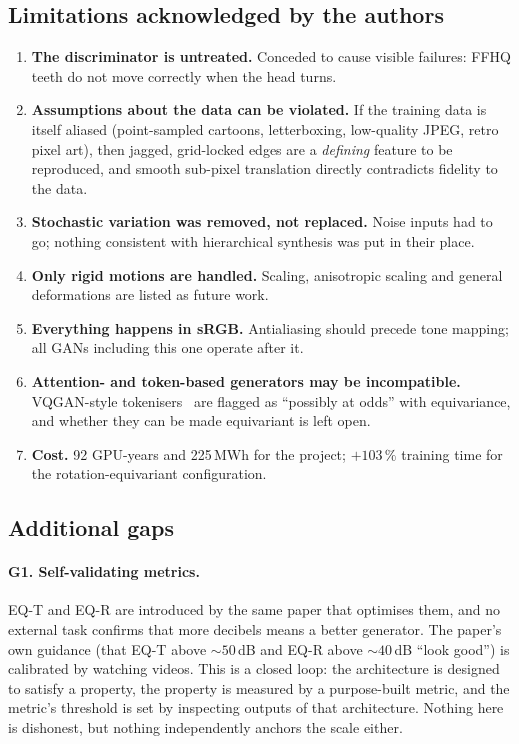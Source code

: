 \documentclass[11pt,a4paper]{article}
\begin{document}
\subsection{Limitations acknowledged by the authors}

\begin{enumerate}[leftmargin=1.5em,itemsep=0.3em]
\item \textbf{The discriminator is untreated.} Conceded to cause visible failures:
FFHQ teeth do not move correctly when the head turns.
\item \textbf{Assumptions about the data can be violated.} If the training data is
      itself aliased (point-sampled cartoons, letterboxing, low-quality JPEG,
      retro pixel art), then jagged, grid-locked edges are a \emph{defining}
      feature to be reproduced, and smooth sub-pixel translation directly
      contradicts fidelity to the data.
\item \textbf{Stochastic variation was removed, not replaced.} Noise inputs had to
      go; nothing consistent with hierarchical synthesis was put in their place.
\item \textbf{Only rigid motions are handled.} Scaling, anisotropic scaling and
      general deformations are listed as future work.
\item \textbf{Everything happens in sRGB.} Antialiasing should precede tone
      mapping; all GANs including this one operate after it.
\item \textbf{Attention- and token-based generators may be incompatible.} VQGAN-style
      tokenisers~\citep{esser2021vqgan} are flagged as ``possibly at odds'' with
      equivariance, and whether they can be made equivariant is left open.
\item \textbf{Cost.} 92 GPU-years and 225\,MWh for the project; $+103\,\%$
      training time for the rotation-equivariant configuration.
\end{enumerate}

\subsection{Additional gaps}

\paragraph{G1. Self-validating metrics.} EQ-T and EQ-R are introduced by
the same paper that optimises them, and no external task confirms that more
decibels means a better generator. The paper's own guidance (that EQ-T above
${\sim}50$\,dB and EQ-R above ${\sim}40$\,dB ``look good'') is calibrated by
watching videos. This is a closed loop: the architecture is designed to satisfy a
property, the property is measured by a purpose-built metric, and the metric's
threshold is set by inspecting outputs of that architecture. Nothing here is
dishonest, but nothing independently anchors the scale either.
\end{document}
